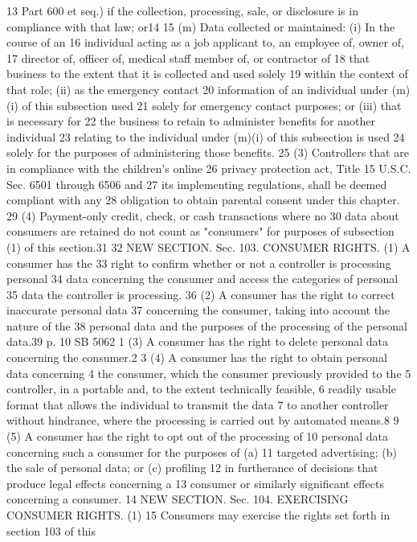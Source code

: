 13 Part 600 et seq.) if the collection, processing, sale, or disclosure
is in compliance with that law; or14
15 (m) Data collected or maintained: (i) In the course of an
16 individual acting as a job applicant to, an employee of, owner of,
17 director of, officer of, medical staff member of, or contractor of
18 that business to the extent that it is collected and used solely
19 within the context of that role; (ii) as the emergency contact
20 information of an individual under (m)(i) of this subsection used
21 solely for emergency contact purposes; or (iii) that is necessary for
22 the business to retain to administer benefits for another individual
23 relating to the individual under (m)(i) of this subsection is used
24 solely for the purposes of administering those benefits.
25 (3) Controllers that are in compliance with the children's online
26 privacy protection act, Title 15 U.S.C. Sec. 6501 through 6506 and
27 its implementing regulations, shall be deemed compliant with any
28 obligation to obtain parental consent under this chapter.
29 (4) Payment-only credit, check, or cash transactions where no
30 data about consumers are retained do not count as "consumers" for
purposes of subsection (1) of this section.31
32 NEW SECTION. Sec. 103. CONSUMER RIGHTS. (1) A consumer has the
33 right to confirm whether or not a controller is processing personal
34 data concerning the consumer and access the categories of personal
35 data the controller is processing.
36 (2) A consumer has the right to correct inaccurate personal data
37 concerning the consumer, taking into account the nature of the
38 personal data and the purposes of the processing of the personal
data.39
p. 10 SB 5062
1 (3) A consumer has the right to delete personal data concerning
the consumer.2
3 (4) A consumer has the right to obtain personal data concerning
4 the consumer, which the consumer previously provided to the
5 controller, in a portable and, to the extent technically feasible,
6 readily usable format that allows the individual to transmit the data
7 to another controller without hindrance, where the processing is
carried out by automated means.8
9 (5) A consumer has the right to opt out of the processing of
10 personal data concerning such a consumer for the purposes of (a)
11 targeted advertising; (b) the sale of personal data; or (c) profiling
12 in furtherance of decisions that produce legal effects concerning a
13 consumer or similarly significant effects concerning a consumer.
14 NEW SECTION. Sec. 104. EXERCISING CONSUMER RIGHTS. (1)
15 Consumers may exercise the rights set forth in section 103 of this
